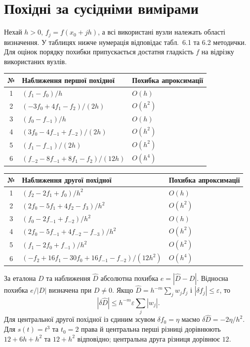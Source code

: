 \documentclass[11pt,a4paper]{article}
\begin{document}
\section{Похідні за сусідніми вимірами}
Нехай $h>0$, $f_j=f(x_0+jh)$, а всі використані вузли належать області визначення. У таблицях нижче нумерація відповідає табл.~6.1 та 6.2 методички. Для оцінок порядку похибки припускається достатня гладкість $f$ на відрізку використаних вузлів.
\begin{center}\begin{tabular}{c l l}
\toprule № & Наближення першої похідної & Похибка апроксимації\\\midrule
1 & $(f_1-f_0)/h$ & $O(h)$\\
2 & $(-3f_0+4f_1-f_2)/(2h)$ & $O(h^2)$\\
3 & $(f_0-f_{-1})/h$ & $O(h)$\\
4 & $(3f_0-4f_{-1}+f_{-2})/(2h)$ & $O(h^2)$\\
5 & $(f_1-f_{-1})/(2h)$ & $O(h^2)$\\
6 & $(f_{-2}-8f_{-1}+8f_1-f_2)/(12h)$ & $O(h^4)$\\\bottomrule
\end{tabular}\end{center}
\begin{center}\begin{tabular}{c l l}
\toprule № & Наближення другої похідної & Похибка апроксимації\\\midrule
1 & $(f_2-2f_1+f_0)/h^2$ & $O(h)$\\
2 & $(2f_0-5f_1+4f_2-f_3)/h^2$ & $O(h^2)$\\
3 & $(f_0-2f_{-1}+f_{-2})/h^2$ & $O(h)$\\
4 & $(2f_0-5f_{-1}+4f_{-2}-f_{-3})/h^2$ & $O(h^2)$\\
5 & $(f_1-2f_0+f_{-1})/h^2$ & $O(h^2)$\\
6 & $(-f_2+16f_1-30f_0+16f_{-1}-f_{-2})/(12h^2)$ & $O(h^4)$\\\bottomrule
\end{tabular}\end{center}
За еталона $D$ та наближення $\widehat D$ абсолютна похибка $e=|\widehat D-D|$.
Відносна похибка $e/|D|$ визначена при $D\ne0$.
Якщо $\widehat D=h^{-m}\sum_j w_j f_j$ і $|\delta f_j|\le\varepsilon$, то
\[
 |\delta\widehat D|\le h^{-m}\varepsilon\sum_j|w_j|.
\]
Для центральної другої похідної із єдиним зсувом $\delta f_0=\eta$ маємо
$\delta\widehat D=-2\eta/h^2$. Для $s(t)=t^3$ та $t_0=2$ права й центральна перші різниці дорівнюють $12+6h+h^2$ та $12+h^2$ відповідно; центральна друга різниця дорівнює $12$.
\end{document}
